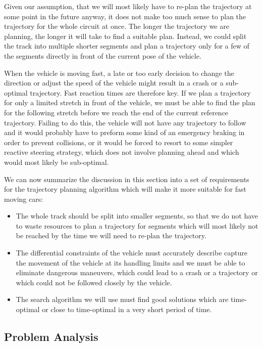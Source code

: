 Given our assumption, that we will most likely have to re-plan the trajectory at some point in the future anyway, it does not make too much sense to plan the trajectory for the whole circuit at once. The longer the trajectory we are planning, the longer it will take to find a suitable plan. Instead, we could split the track into multiple shorter segments and plan a trajectory only for a few of the segments directly in front of the current pose of the vehicle.

When the vehicle is moving fast, a late or too early decision to change the direction or adjust the speed of the vehicle might result in a crash or a sub-optimal trajectory. Fast reaction times are therefore key. If we plan a trajectory for only a limited stretch in front of the vehicle, we must be able to find the plan for the following stretch before we reach the end of the current reference trajectory. Failing to do this, the vehicle will not have any trajectory to follow and it would probably have to preform some kind of an emergency braking in order to prevent collisions, or it would be forced to resort to some simpler reactive steering strategy, which does not involve planning ahead and which would most likely be sub-optimal.

We can now summarize the discussion in this section into a set of requirements for the trajectory planning algorithm which will make it more suitable for fast moving cars:

\begin{itemize}
	\item The whole track should be split into smaller segments, so that we do not have to waste resources to plan a trajectory for segments which will most likely not be reached by the time we will need to re-plan the trajectory.
	\item The differential constraints of the vehicle must accurately describe capture the movement of the vehicle at its handling limits and we must be able to eliminate dangerous maneuvers, which could lead to a crash or a trajectory or which could not be followed closely by the vehicle.
	\item The search algorithm we will use must find good solutions which are time-optimal or close to time-optimal in a very short period of time.
\end{itemize}

\subsection{Problem Analysis}

